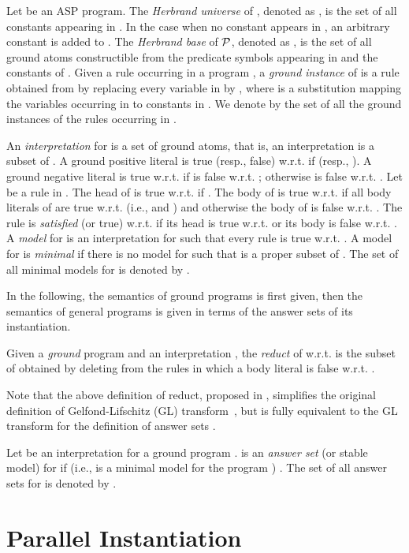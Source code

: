 \documentclass[preprint]{tlp}
\newcommand{\p}{\ensuremath{{\cal P}}\xspace}
\begin{document}
Let  be an ASP program. The {\em Herbrand universe}
of , denoted as , is the set of all constants appearing
in . In the case when no constant appears in , an arbitrary constant
 is added to . The {\em Herbrand base} of \p{},
denoted as , is the set of all ground atoms constructible
from the predicate symbols appearing in  and the constants of
.
Given a rule  occurring in a program , a {\em ground
instance} of   is a rule obtained from  by replacing every
variable  in  by , where 
 is a substitution mapping the variables occurring in  to
constants in . We denote by  the set of all the
ground instances of the rules occurring in .

 An {\em interpretation} for  is a set of ground atoms, that
is, an interpretation is a subset  of . A ground positive
literal  is true (resp., false) w.r.t.  if
  (resp.,  ). A ground
negative literal  is true w.r.t.  if  is false
w.r.t. ; otherwise  is false w.r.t. .
Let   be a rule in .  The head of  is
true w.r.t.  if . The body of
  is true w.r.t.  if all body
literals of   are true w.r.t.   (i.e.,  
and  ) and otherwise the body of  is false w.r.t. .
The rule   is {\em satisfied} (or true) w.r.t.
  if its head is true w.r.t.   or its body
is false w.r.t.  .
A {\em model} for  
 is an interpretation   for
  such that every rule   is
true w.r.t.  .  A model   for   is {\em minimal} if there is no
model   for 
such that  is a proper subset of  . The set of all minimal
models for   is denoted by  .

In the following, the semantics of ground programs is first given,
then the semantics of general programs is given in terms of the answer sets of its instantiation.

Given a {\em ground} program   and an interpretation  , the
{\em reduct} of  w.r.t.  is the subset  of  obtained
by deleting from  the rules in which a body literal is false w.r.t. .

Note that the above definition of reduct, proposed in
\cite{fabe-etal-2004-jelia}, simplifies the original definition of
Gelfond-Lifschitz (GL) transform~\cite{gelf-lifs-91}, but is fully
equivalent to the GL transform for the definition of answer sets
\cite{fabe-etal-2004-jelia}.

Let   be an interpretation for a ground program  .   is an {\em answer set} (or stable model)
for   if  (i.e.,   is a minimal model for the program ) \cite{fabe-etal-2004-jelia}.
The set of all answer sets for  is denoted by .

\section{Parallel Instantiation}\label{sec:parallel}
\end{document}
